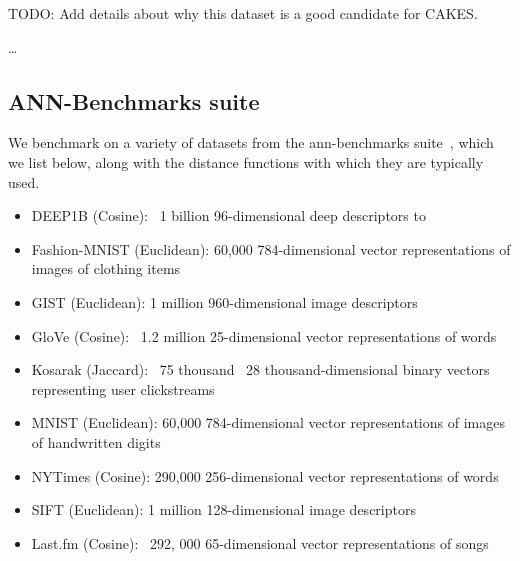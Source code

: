 TODO: Add details about why this dataset is a good candidate for CAKES.

\dots

\subsection{ANN-Benchmarks suite}
\label{subsec:datasets:ann-benchmarks-suite}

We benchmark on a variety of datasets from the ann-benchmarks suite~\cite{Aumller2018ANNBenchmarksAB}, 
which we list below, along with the distance functions with which they are typically used.

\begin{itemize} 
    \item DEEP1B (Cosine): ~1 billion 96-dimensional deep descriptors to 
    \item Fashion-MNIST (Euclidean): 60,000 784-dimensional vector representations of images of clothing items
    \item GIST (Euclidean): 1 million 960-dimensional image descriptors 
    \item GloVe (Cosine): ~1.2 million 25-dimensional vector representations of words
    \item Kosarak (Jaccard): ~75 thousand ~28 thousand-dimensional binary vectors representing user clickstreams
    \item MNIST (Euclidean): 60,000 784-dimensional vector representations of images of handwritten digits
    \item NYTimes (Cosine): 290,000 256-dimensional vector representations of words
    \item SIFT (Euclidean): 1 million 128-dimensional image descriptors
    \item Last.fm (Cosine): ~292, 000 65-dimensional vector representations of songs
\end{itemize}